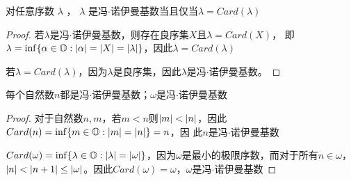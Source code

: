 \documentclass[11pt]{article}
\begin{document}
\begin{exercise}[2.1.24]
对任意序数 \(\lambda\) ， \(\lambda\) 是冯\(\cdot\)诺伊曼基数当且仅当\(\lambda=Card(\lambda)\)
\end{exercise}

\begin{proof}
若\(\lambda\)是冯\(\cdot\)诺伊曼基数，则存在良序集\(X\)且\(\lambda=Card(X)\)，
即\(\lambda=\inf\{\alpha\in\O:\abs{\alpha}=\abs{X}=\abs{\lambda}\}\)，因此\(\lambda=Card(\lambda)\)

若\(\lambda=Card(\lambda)\)，因为\(\lambda\)是良序集，因此\(\lambda\)是冯\(\cdot\)诺伊曼基数。
\end{proof}

\begin{exercise}[2.1.25]
每个自然数\(n\)都是冯\(\cdot\)诺伊曼基数；\(\omega\)是冯\(\cdot\)诺伊曼基数
\end{exercise}

\begin{proof}
对于自然数\(n,m\)，若\(m<n\)则\(\abs{m}<\abs{n}\)，因此\(Card(n)=\inf\{m\in\O:\abs{m}=\abs{n}\}=n\)，因
此\(n\)是冯\(\cdot\)诺伊曼基数

\(Card(\omega)=\inf\{\lambda\in\O:\abs{\lambda}=\abs{\omega}\}\)，因为\(\omega\)是最小的极限序数，而对于所有\(n\in\omega\)，
\(\abs{n}<\abs{n+1}\le\abs{\omega}\)。因此\(Card(\omega)=\omega\)，\(\omega\)是冯\(\cdot\)诺伊曼基数
\end{proof}
\end{document}
